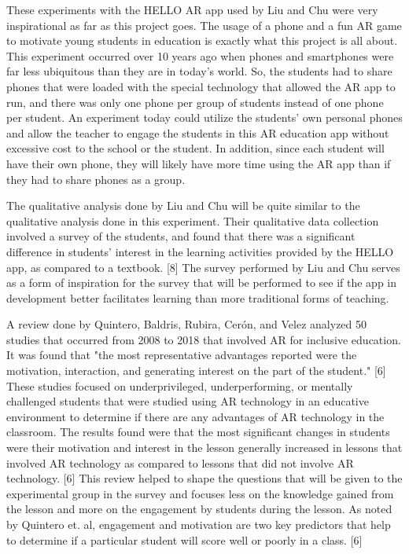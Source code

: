 \documentclass{vgtc}                          %
\begin{document}
	These experiments with the HELLO AR app used by Liu and Chu were very inspirational as far as this project goes. The usage of a phone and a fun AR game to motivate young students in education is exactly what this project is all about. This experiment occurred over 10 years ago when phones and smartphones were far less ubiquitous than they are in today's world. So, the students had to share phones that were loaded with the special technology that allowed the AR app to run, and there was only one phone per group of students instead of one phone per student. An experiment today could utilize the students' own personal phones and allow the teacher to engage the students in this AR education app without excessive cost to the school or the student. In addition, since each student will have their own phone, they will likely have more time using the AR app than if they had to share phones as a group.
\vspace*{4mm}

	The qualitative analysis done by Liu and Chu will be quite similar to the qualitative analysis done in this experiment. Their qualitative data collection involved a survey of the students, and found that there was a significant difference in students' interest in the learning activities provided by the HELLO app, as compared to a textbook. [8] The survey performed by Liu and Chu serves as a form of inspiration for the survey that will be performed to see if the app in development better facilitates learning than more traditional forms of teaching. 
\vspace*{4mm}

	A review done by Quintero, Baldris, Rubira, Cerón, and Velez analyzed 50 studies that occurred from 2008 to 2018 that involved AR for inclusive education. It was found that "the most representative advantages reported were the motivation, interaction, and generating interest on the part of the student." [6] These studies focused on underprivileged, underperforming, or mentally challenged students that were studied using AR technology in an educative environment to determine if there are any advantages of AR technology in the classroom. The results found were that the most significant changes in students were their motivation and interest in the lesson generally increased in lessons that involved AR technology as compared to lessons that did not involve AR technology. [6] This review helped to shape the questions that will be given to the experimental group in the survey and focuses less on the knowledge gained from the lesson and more on the engagement by students during the lesson. As noted by Quintero et. al, engagement and motivation are two key predictors that help to determine if a particular student will score well or poorly in a class. [6]
\vspace*{4mm}
\end{document}
